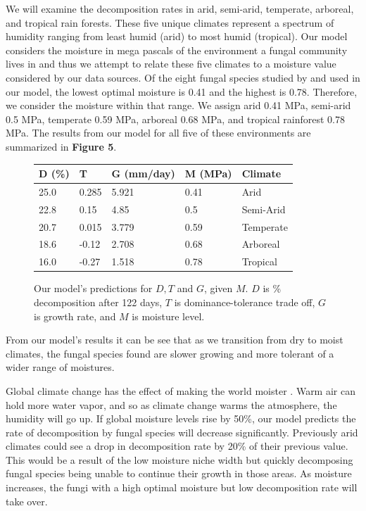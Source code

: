 \documentclass[12pt]{article}
\begin{document}
We will examine the decomposition rates in arid, semi-arid, temperate, arboreal, and tropical rain forests. These five unique climates represent a spectrum of humidity ranging from least humid (arid) to most humid (tropical). Our model considers the moisture in mega pascals of the environment a fungal community lives in and thus we attempt to relate these five climates to a moisture value considered by our data sources. Of the eight fungal species studied by \cite{source25} and used in our model, the lowest optimal moisture is 0.41 and the highest is 0.78. Therefore, we consider the moisture within that range. We assign arid 0.41 MPa, semi-arid 0.5 MPa, temperate 0.59 MPa, arboreal 0.68 MPa, and tropical rainforest 0.78 MPa. The results from our model for all five of these environments are summarized in
\textbf{Figure 5}. 



\begin{figure}[h!]
\begin{center}
\begin{tabular}{|lllll|}
\hline
D (\%) & T     & G (mm/day) & M (MPa) & Climate   \\ \hline
25.0   & 0.285 & 5.921      & 0.41    & Arid      \\
22.8   & 0.15  & 4.85       & 0.5     & Semi-Arid \\
20.7   & 0.015 & 3.779      & 0.59    & Temperate \\
18.6   & -0.12 & 2.708      & 0.68    & Arboreal  \\
16.0   & -0.27 & 1.518      & 0.78    & Tropical  \\ \hline
\end{tabular}
\caption{Our model's predictions for $D,T$ and $G$, given $M.$ $D$ is \% decomposition after 122 days, $T$ is dominance-tolerance trade off, $G$ is growth rate, and $M$ is moisture level. } 
\end{center}
\end{figure}

From our model's results it can be see that as we transition from dry to moist climates, the fungal species found are slower growing and more tolerant of a wider range of moistures.

Global climate change has the effect of making the world moister \cite{moist}. Warm air can hold more water vapor, and so as climate change warms the atmosphere, the humidity will go up. 
If global moisture levels rise by 50\%, our model predicts the rate of decomposition by fungal species will decrease significantly. Previously arid climates could see a drop in decomposition rate by 20\% of their previous value. 
This would be a result of the low moisture niche width but quickly decomposing fungal species being unable to continue their growth in those areas. 
As moisture increases, the fungi with a high optimal moisture but low decomposition rate will take over. 
\end{document}
